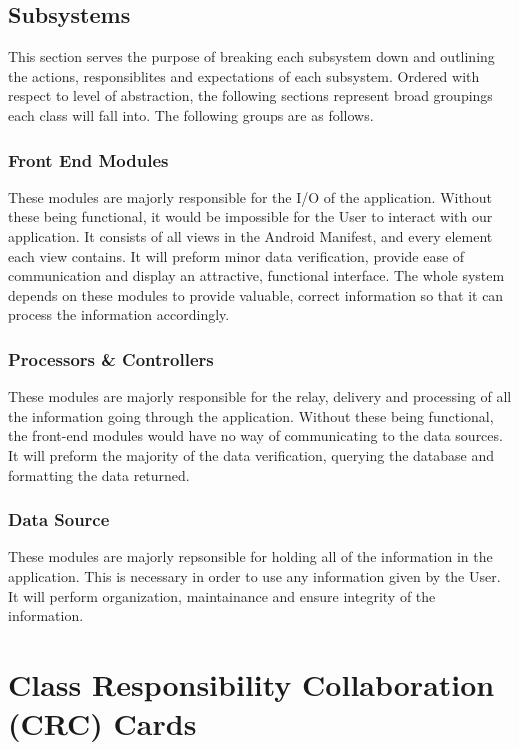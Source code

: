 \documentclass[]{article}
\begin{document}
\FloatBarrier

\subsection{Subsystems}
\label{sub:subsystems}
This section serves the purpose of breaking each subsystem down and outlining the actions, responsiblites and expectations of each subsystem. Ordered with respect to level of abstraction, the following sections represent broad groupings each class will fall into. The following groups are as follows.
\subsubsection{Front End Modules}
These modules are majorly responsible for the I/O of the application. Without these being functional, it would be impossible for the User to interact with our application. It consists of all views in the Android Manifest, and every element each view contains. It will preform minor data verification, provide ease of communication and display an attractive, functional interface. The whole system depends on these modules to provide valuable, correct information so that it can process the information accordingly.
\subsubsection{Processors \& Controllers}
These modules are majorly responsible for the relay, delivery and processing of all the information going through the application. Without these being functional, the front-end modules would have no way of communicating to the data sources. It will preform the majority of the data verification, querying the database and formatting the data returned.
\subsubsection{Data Source}
These modules are majorly repsonsible for holding all of the information in the application. This is necessary in order to use any information given by the User. It will perform organization, maintainance and ensure integrity of the information.

\section{Class Responsibility Collaboration (CRC) Cards}
\label{sec:class_responsibility_collaboration_crc_cards}
\end{document}
